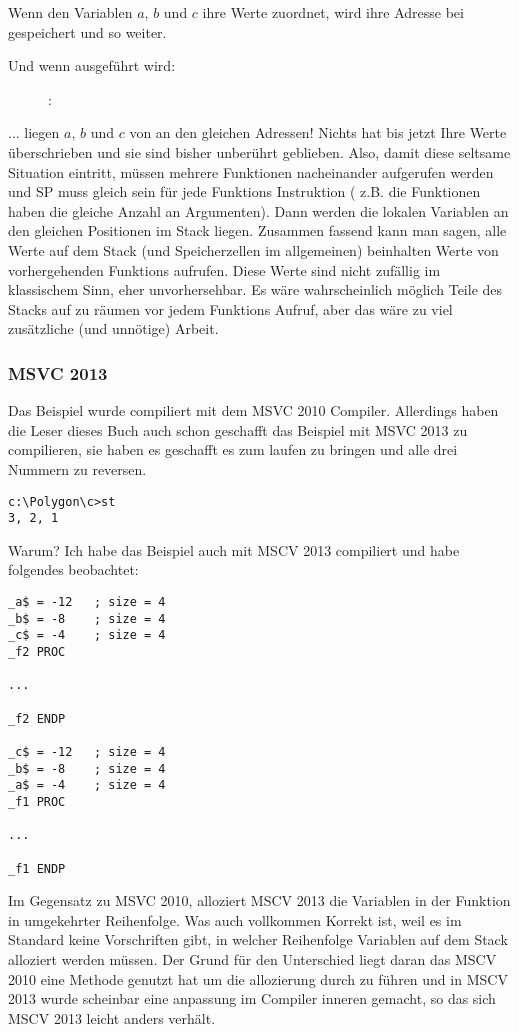 Wenn  den Variablen $a$, $b$ und $c$ ihre Werte zuordnet, wird ihre Adresse bei  gespeichert und so weiter. 

\clearpage
Und wenn  ausgeführt wird:

\begin{figure}[H]
\centering
{}
\caption{\olly: }
\label{fig:stack_noise_olly2}
\end{figure}

... liegen $a$, $b$ und $c$ von   an den gleichen Adressen!
Nichts hat bis jetzt Ihre Werte überschrieben und sie sind bisher
unberührt geblieben. Also, damit diese seltsame Situation eintritt, müssen
mehrere Funktionen nacheinander aufgerufen werden und \ac{SP} muss gleich 
sein für jede Funktions Instruktion ( z.B. die Funktionen haben die 
gleiche Anzahl an Argumenten). Dann werden die lokalen Variablen an den
gleichen Positionen im Stack liegen. Zusammen fassend kann man sagen, alle
Werte auf dem Stack (und Speicherzellen im allgemeinen) beinhalten Werte
von vorhergehenden Funktions aufrufen. Diese Werte sind nicht zufällig 
im klassischem Sinn, eher unvorhersehbar. Es wäre wahrscheinlich möglich 
Teile des Stacks auf zu räumen vor jedem Funktions Aufruf, aber das wäre
zu viel zusätzliche (und unnötige) Arbeit. 

\subsubsection{MSVC 2013}

Das Beispiel wurde compiliert mit dem MSVC 2010 Compiler.
Allerdings haben die Leser dieses Buch auch schon geschafft das Beispiel mit MSVC 2013 zu compilieren, sie haben es geschafft es zum laufen zu bringen und alle drei Nummern zu reversen.

\begin{lstlisting}
c:\Polygon\c>st
3, 2, 1
\end{lstlisting}

Warum? 
Ich habe das Beispiel auch mit MSCV 2013 compiliert und habe folgendes beobachtet:

\begin{lstlisting}[caption=MSVC 2013,style=customasmx86]
_a$ = -12	; size = 4
_b$ = -8	; size = 4
_c$ = -4	; size = 4
_f2	PROC

...

_f2	ENDP

_c$ = -12	; size = 4
_b$ = -8	; size = 4
_a$ = -4	; size = 4
_f1	PROC

...

_f1	ENDP
\end{lstlisting}

Im Gegensatz zu MSVC 2010, alloziert MSCV 2013 die Variablen in der Funktion  in umgekehrter Reihenfolge.%
Was auch vollkommen Korrekt ist, weil es im \CCpp Standard keine Vorschriften gibt, in welcher Reihenfolge Variablen auf dem Stack alloziert werden müssen. Der Grund für den Unterschied liegt daran das MSCV 2010 eine Methode genutzt hat um  die allozierung durch zu führen und in MSCV 2013 wurde scheinbar eine anpassung im Compiler inneren gemacht, so das sich MSCV 2013 leicht anders verhält.

